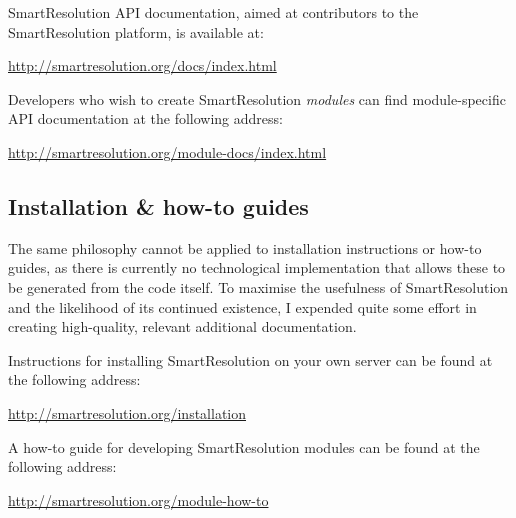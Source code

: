 SmartResolution API documentation, aimed at contributors to the SmartResolution platform, is available at:

\url{http://smartresolution.org/docs/index.html}

Developers who wish to create SmartResolution \emph{modules} can find module-specific API documentation at the following address:

\url{http://smartresolution.org/module-docs/index.html}

\subsection{Installation \& how-to guides}

The same philosophy cannot be applied to installation instructions or how-to guides, as there is currently no technological implementation that allows these to be generated from the code itself. To maximise the usefulness of SmartResolution and the likelihood of its continued existence, I expended quite some effort in creating high-quality, relevant additional documentation.

Instructions for installing SmartResolution on your own server can be found at the following address:

\url{http://smartresolution.org/installation}

A how-to guide for developing SmartResolution modules can be found at the following address:

\url{http://smartresolution.org/module-how-to}